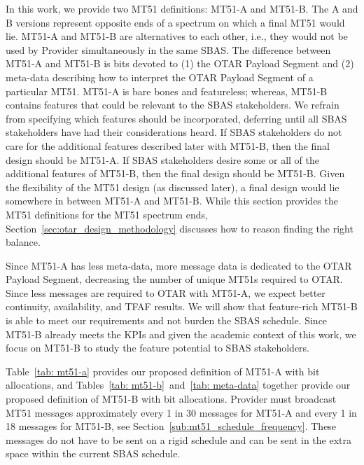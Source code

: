 \documentclass[letterpaper,times]{IONconf/IONconf}
\begin{document}
		In this work, we provide two MT51 definitions: MT51-A and MT51-B.
		The A and B versions represent opposite ends of a spectrum on which a final MT51 would lie.
		MT51-A and MT51-B are alternatives to each other, i.e., they would not be used by Provider simultaneously in the same SBAS.
		The difference between MT51-A and MT51-B is bits devoted to (1) the OTAR Payload Segment and (2) meta-data describing how to interpret the OTAR Payload Segment of a particular MT51.
		MT51-A is bare bones and featureless; whereas, MT51-B contains features that could be relevant to the SBAS stakeholders.
		We refrain from specifying which features should be incorporated, deferring until all SBAS stakeholders have had their considerations heard.
		If SBAS stakeholders do not care for the additional features described later with MT51-B, then the final design should be MT51-A.
		If SBAS stakeholders desire some or all of the additional features of MT51-B, then the final design should be MT51-B.
		Given the flexibility of the MT51 design (as discussed later), a final design would lie somewhere in between MT51-A and MT51-B.
		While this section provides the MT51 definitions for the MT51 spectrum ends, Section~\ref{sec:otar_design_methodology} discusses how to reason finding the right balance.
		
		Since MT51-A has less meta-data, more message data is dedicated to the OTAR Payload Segment, decreasing the number of unique MT51s required to OTAR.
		Since less messages are required to OTAR with MT51-A, we expect better continuity, availability, and TFAF results.
		We will show that feature-rich MT51-B is able to meet our requirements and not burden the SBAS schedule.
		Since MT51-B already meets the KPIs and given the academic context of this work, we focus on MT51-B to study the feature potential to SBAS stakeholders.
		
		Table~\ref{tab: mt51-a} provides our proposed definition of MT51-A with bit allocations, and Tables~\ref{tab: mt51-b}~and~\ref{tab: meta-data} together provide our proposed definition of MT51-B with bit allocations.
		Provider must broadcast MT51 messages approximately every 1 in 30 messages for MT51-A and every 1 in 18 messages for MT51-B, see Section~\ref{sub:mt51_schedule_frequency}.
		These messages do not have to be sent on a rigid schedule and can be sent in the extra space within the current SBAS schedule.
\end{document}
